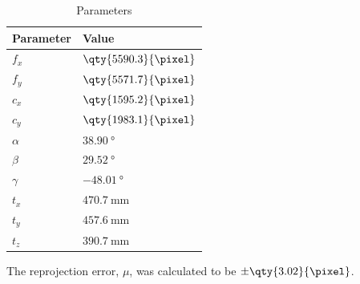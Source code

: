\begin{table}[H]
    \centering
    \caption{Parameters}
    \begin{tabular}{| C{0.15\textwidth} | C{0.30\textwidth} |}
        \hline
        Parameter & Value                   \\
        \hline
        \hline
        $f_x$     & $\qty{5590.3}{\pixel}$ \\
        $f_y$     & $\qty{5571.7}{\pixel}$ \\
        \hline
        $c_x$     & $\qty{1595.2}{\pixel}$ \\
        $c_y$     & $\qty{1983.1}{\pixel}$ \\
        \hline
        $\alpha$  & $\qty{38.90}{\degree}$  \\
        $\beta$   & $\qty{29.52}{\degree}$  \\
        $\gamma$  & $\qty{-48.01}{\degree}$ \\
        \hline
        $t_x$     & $\qty{470.7}{\mm}$     \\
        $t_y$     & $\qty{457.6}{\mm}$     \\
        $t_z$     & $\qty{390.7}{\mm}$     \\
        \hline
    \end{tabular}
\end{table}


The reprojection error, $\mu$, was calculated to be $\pm \qty{3.02}{\pixel}$.

